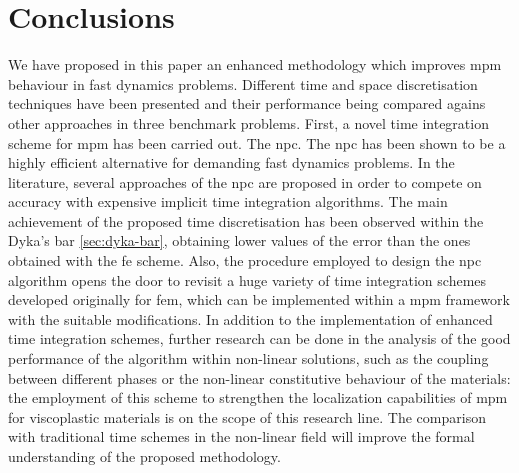 \documentclass[preprint,12pt,a4paper]{elsarticle}
\begin{document}
\section{Conclusions}
\label{sec:conclusions}
We have proposed in this paper an enhanced methodology which improves \acrfull{mpm} behaviour in fast dynamics problems. Different time and space discretisation techniques have been presented and their performance being compared agains other approaches in three benchmark problems.
First, a novel time integration scheme for \acrshort{mpm} has been carried out. The \acrfull{npc}. The \acrshort{npc} has been shown to be a highly efficient alternative for demanding fast dynamics problems. In the literature, several approaches of the \acrshort{npc} are proposed in order to compete on accuracy with expensive implicit time integration algorithms. The main achievement of the proposed time discretisation has been observed within the Dyka's bar \ref{sec:dyka-bar}, obtaining lower values of the error than the ones obtained with the \acrfull{fe} scheme.
Also, the procedure employed to design the \acrshort{npc} algorithm opens the
door to revisit a huge variety of time integration schemes developed
originally for \acrshort{fem}, which can be implemented within a \acrshort{mpm} framework with the suitable modifications. In addition to the implementation of enhanced time integration schemes, further research can be done in the analysis of the good performance of the algorithm within non-linear solutions, such as the coupling between different phases or the non-linear constitutive behaviour of the materials: the employment of this scheme to strengthen the localization capabilities of \acrshort{mpm} for viscoplastic materials is on the scope of this research line. The comparison with traditional time schemes in the non-linear field will improve the formal understanding of the proposed methodology.
\end{document}
